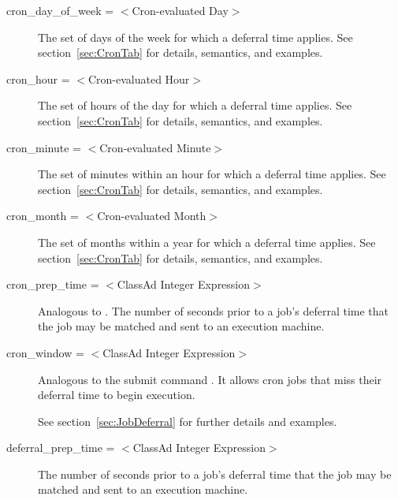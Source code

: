 \begin{description}
\item[cron\_day\_of\_week = $<$Cron-evaluated Day$>$]
The set of days of the week for which a deferral time applies.
See section~\ref{sec:CronTab} for details, semantics, and examples.

\item[cron\_hour = $<$Cron-evaluated Hour$>$]
The set of hours of the day for which a deferral time applies.
See section~\ref{sec:CronTab} for details, semantics, and examples.

\item[cron\_minute = $<$Cron-evaluated Minute$>$]
The set of minutes within an hour for which a deferral time applies.
See section~\ref{sec:CronTab} for details, semantics, and examples.

\item[cron\_month = $<$Cron-evaluated Month$>$]
The set of months within a year for which a deferral time applies.
See section~\ref{sec:CronTab} for details, semantics, and examples.

\item[cron\_prep\_time = $<$ClassAd Integer Expression$>$]
Analogous to .
The number of seconds prior to a job's deferral time that
the job may be matched and sent to an execution machine.


\item[cron\_window = $<$ClassAd Integer Expression$>$]
Analogous to the submit command .
It allows cron jobs that
miss their deferral time to begin execution.

See section~\ref{sec:JobDeferral} for further details and examples.


\item[deferral\_prep\_time = $<$ClassAd Integer Expression$>$]
The number of seconds prior to a job's deferral time that
the job may be matched and sent to an execution machine.


\end{description}
